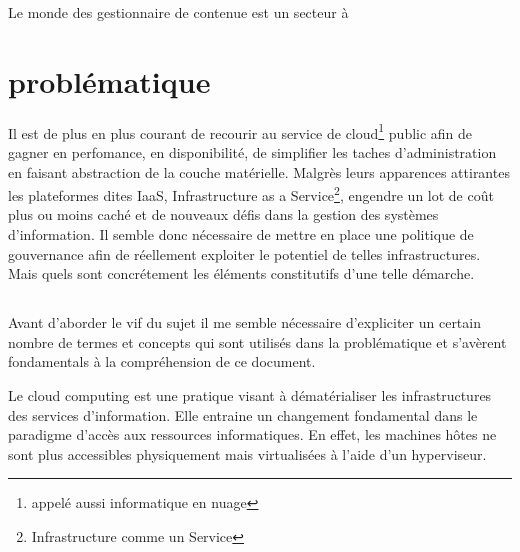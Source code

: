 \documentclass[11pt, a4paper ]{article}
\let\stdsection\section
\renewcommand\section{\newpage\stdsection}
\begin{document}
Le monde des gestionnaire de contenue est un secteur à







		\section{problématique} %



Il est de plus en plus courant de recourir au service de cloud\footnote{appelé aussi informatique en nuage} public afin de gagner en perfomance, en disponibilité, de simplifier les taches d'administration en faisant abstraction de la couche matérielle.
Malgrès leurs apparences attirantes les plateformes dites IaaS, Infrastructure as a Service\footnote{Infrastructure comme un Service}, engendre un lot de coût plus ou moins caché et de nouveaux défis dans la gestion des systèmes d'information. Il semble donc nécessaire de mettre en place une politique de gouvernance afin de réellement exploiter le potentiel de telles infrastructures.
Mais quels sont concrétement les éléments constitutifs d'une telle démarche.

			\subsection*{}

Avant d'aborder le vif du sujet il me semble nécessaire d'expliciter un certain nombre de termes et concepts qui sont utilisés dans la problématique et s'avèrent fondamentals à la compréhension de ce document.

Le cloud computing\cite{cloudDef} est une pratique visant à dématérialiser les infrastructures des services d'information. Elle entraine un changement fondamental dans le paradigme d'accès aux ressources informatiques. En effet, les machines hôtes ne sont plus accessibles physiquement mais virtualisées à l'aide d'un hyperviseur.
\end{document}
